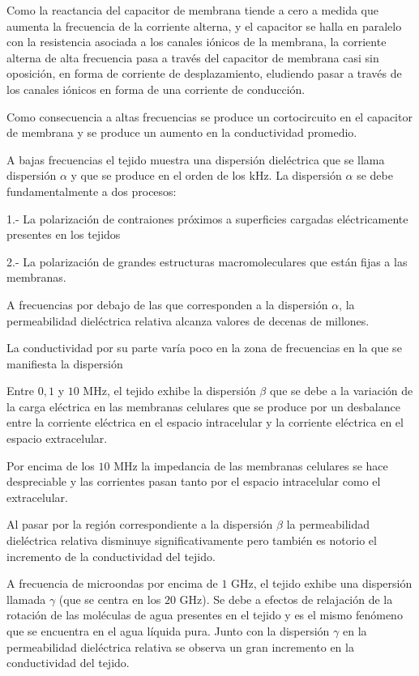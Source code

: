 Como la reactancia del capacitor de membrana tiende a cero a medida que aumenta la frecuencia de la corriente alterna, y el capacitor se halla en paralelo con la resistencia asociada a los canales iónicos de la membrana, la corriente alterna de alta frecuencia pasa a través del capacitor de membrana casi sin oposición, en forma de corriente de desplazamiento, eludiendo pasar a través de los canales iónicos en forma de una corriente de conducción.

Como consecuencia a altas frecuencias se produce un cortocircuito en el capacitor de membrana y se produce un aumento en la conductividad promedio.

A bajas frecuencias el tejido muestra una dispersión dieléctrica que se llama dispersión $\alpha$ y que se produce en el orden de los kHz. La dispersión $\alpha$ se debe fundamentalmente a dos procesos: 
	
	1.- La polarización de contraiones próximos a superficies cargadas eléctricamente presentes en los tejidos 
	
	2.- La polarización de grandes estructuras macromoleculares que están fijas a las membranas.

A frecuencias por debajo de las que corresponden a la dispersión $\alpha$, la permeabilidad dieléctrica relativa alcanza valores de decenas de millones. 

La conductividad por su parte varía poco en la zona de frecuencias en la que se manifiesta la dispersión

Entre $0,1$ y $10$ MHz, el tejido exhibe la dispersión $\beta$ que se debe a la variación de la carga eléctrica en las membranas celulares que se produce por un desbalance entre la corriente eléctrica en el espacio intracelular y la corriente eléctrica en el espacio extracelular.

Por encima de los $10$ MHz la impedancia de las membranas celulares se hace despreciable y las corrientes pasan tanto por el espacio intracelular como el extracelular.

Al pasar por la región correspondiente a la dispersión $\beta$ la permeabilidad dieléctrica relativa disminuye significativamente pero también es notorio el incremento de la conductividad del tejido.

A frecuencia de microondas por encima de $1$ GHz, el tejido exhibe una dispersión llamada $\gamma$ (que se centra en los $20$ GHz). Se debe a efectos de relajación de la rotación de las moléculas de agua presentes en el tejido y es el mismo fenómeno que se encuentra en el agua líquida pura. Junto con la dispersión $\gamma$ en la permeabilidad dieléctrica relativa se observa un gran incremento en la conductividad del tejido.


